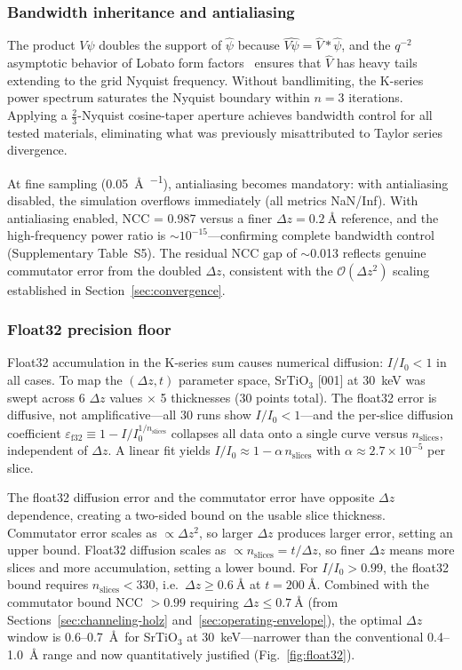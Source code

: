 \documentclass[twoside,11pt]{article}
\begin{document}
\subsubsection{Bandwidth inheritance and antialiasing}

The product $V\psi$ doubles the support of $\hat\psi$ because $\widehat{V\psi}=\hat V*\hat\psi$, and the $q^{-2}$ asymptotic behavior of Lobato form factors~\cite{LobatoVanDyck2014} ensures that $\hat V$ has heavy tails extending to the grid Nyquist frequency. Without bandlimiting, the K-series power spectrum saturates the Nyquist boundary within $n=3$ iterations. Applying a $\tfrac23$-Nyquist cosine-taper aperture achieves bandwidth control for all tested materials, eliminating what was previously misattributed to Taylor series divergence.

At fine sampling (\SI{0.05}{\angstrom\per\pixel}), antialiasing becomes mandatory: with antialiasing disabled, the simulation overflows immediately (all metrics NaN/Inf). With antialiasing enabled, NCC = 0.987 versus a finer $\Delta z=\SI{0.2}{\angstrom}$ reference, and the high-frequency power ratio is $\sim10^{-15}$---confirming complete bandwidth control (Supplementary Table~S5). The residual NCC gap of $\sim$0.013 reflects genuine commutator error from the doubled $\Delta z$, consistent with the $\mathcal O(\Delta z^2)$ scaling established in Section~\ref{sec:convergence}.


\subsubsection{Float32 precision floor}\label{sec:float32}

Float32 accumulation in the K-series sum causes numerical diffusion: $I/I_0<1$ in all cases. To map the $(\Delta z, t)$ parameter space, SrTiO$_3$ [001] at \SI{30}{\keV} was swept across 6 $\Delta z$ values $\times$ 5 thicknesses (30 points total). The float32 error is diffusive, not amplificative---all 30 runs show $I/I_0<1$---and the per-slice diffusion coefficient $\varepsilon_\text{f32}\equiv1-I/I_0^{1/n_\text{slices}}$ collapses all data onto a single curve versus $n_\text{slices}$, independent of $\Delta z$. A linear fit yields $I/I_0\approx1-\alpha\,n_\text{slices}$ with $\alpha\approx2.7\times10^{-5}$ per slice.

The float32 diffusion error and the commutator error have opposite $\Delta z$ dependence, creating a two-sided bound on the usable slice thickness. Commutator error scales as $\propto\Delta z^2$, so larger $\Delta z$ produces larger error, setting an upper bound. Float32 diffusion scales as $\propto n_\text{slices}=t/\Delta z$, so finer $\Delta z$ means more slices and more accumulation, setting a lower bound. For $I/I_0>0.99$, the float32 bound requires $n_\text{slices}<330$, i.e.\ $\Delta z\ge\SI{0.6}{\angstrom}$ at $t=\SI{200}{\angstrom}$. Combined with the commutator bound NCC $>0.99$ requiring $\Delta z\le\SI{0.7}{\angstrom}$ (from Sections~\ref{sec:channeling-holz} and~\ref{sec:operating-envelope}), the optimal $\Delta z$ window is 0.6--0.7~\AA\ for SrTiO$_3$ at \SI{30}{\keV}---narrower than the conventional 0.4--1.0~\AA{} range and now quantitatively justified (Fig.~\ref{fig:float32}).
\end{document}
